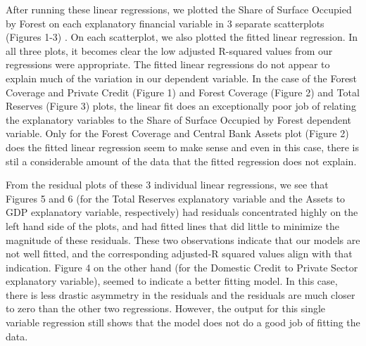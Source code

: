 \documentclass[
  12pt,
]{article}
\begin{document}
After running these linear regressions, we plotted the Share of Surface
Occupied by Forest on each explanatory financial variable in 3 separate
scatterplots (Figures 1-3) . On each scatterplot, we also plotted the
fitted linear regression. In all three plots, it becomes clear the low
adjusted R-squared values from our regressions were appropriate. The
fitted linear regressions do not appear to explain much of the variation
in our dependent variable. In the case of the Forest Coverage and
Private Credit (Figure 1) and Forest Coverage (Figure 2) and Total
Reserves (Figure 3) plots, the linear fit does an exceptionally poor job
of relating the explanatory variables to the Share of Surface Occupied
by Forest dependent variable. Only for the Forest Coverage and Central
Bank Assets plot (Figure 2) does the fitted linear regression seem to
make sense and even in this case, there is stil a considerable amount of
the data that the fitted regression does not explain.

From the residual plots of these 3 individual linear regressions, we see
that Figures 5 and 6 (for the Total Reserves explanatory variable and
the Assets to GDP explanatory variable, respectively) had residuals
concentrated highly on the left hand side of the plots, and had fitted
lines that did little to minimize the magnitude of these residuals.
These two observations indicate that our models are not well fitted, and
the corresponding adjusted-R squared values align with that indication.
Figure 4 on the other hand (for the Domestic Credit to Private Sector
explanatory variable), seemed to indicate a better fitting model. In
this case, there is less drastic asymmetry in the residuals and the
residuals are much closer to zero than the other two regressions.
However, the output for this single variable regression still shows that
the model does not do a good job of fitting the data.
\end{document}
